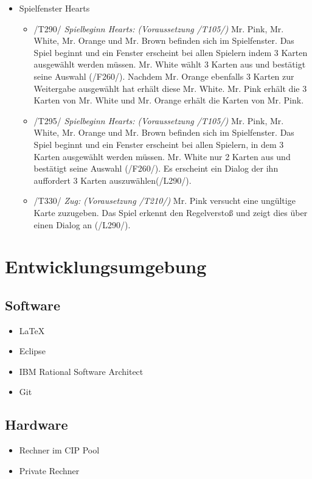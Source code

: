 \documentclass{article}
\begin{document}
\begin{itemize}
\begin{itemize}
	\end{itemize}
	
	\item Spielfenster Hearts
	
	\begin{itemize}
	
		\item /T290/ \textit{Spielbeginn Hearts: (Voraussetzung /T105/)} Mr. Pink, Mr. White, Mr. Orange und Mr. Brown befinden sich im Spielfenster. Das Spiel beginnt und ein Fenster erscheint bei allen Spielern indem 3 Karten ausgewählt werden müssen. Mr. White wählt 3 Karten aus und bestätigt seine Auswahl (/F260/). Nachdem Mr. Orange ebenfalls 3 Karten zur Weitergabe ausgewählt hat erhält diese Mr. White. Mr. Pink erhält die 3 Karten von Mr. White und  Mr. Orange erhält die Karten von Mr. Pink.

		\item /T295/ \textit{Spielbeginn Hearts: (Voraussetzung /T105/)} Mr. Pink, Mr. White, Mr. Orange und Mr. Brown befinden sich im Spielfenster. Das Spiel beginnt und ein Fenster erscheint bei allen Spielern, in dem 3 Karten ausgewählt werden müssen. Mr. White nur 2 Karten aus und bestätigt seine Auswahl (/F260/). Es erscheint ein Dialog der ihn auffordert 3 Karten auszuwählen(/L290/).

		\item /T330/ \textit{Zug: (Vorausetzung /T210/)} Mr. Pink versucht eine ungültige Karte zuzugeben. Das Spiel erkennt den Regelverstoß und zeigt dies über einen Dialog an (/L290/).
	\end{itemize}
\end{itemize}

\section{Entwicklungsumgebung}
\subsection{Software}
\begin{itemize}
	\item LaTeX
	\item Eclipse
	\item IBM Rational Software Architect
	\item Git
\end{itemize}

\subsection{Hardware}
\begin{itemize}
	\item Rechner im CIP Pool	
	\item Private Rechner
\end{itemize}
\end{document}
